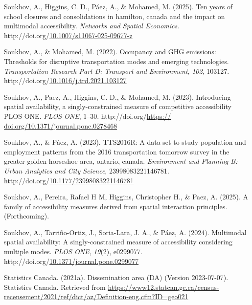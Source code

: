 \documentclass[
11pt, %
oneside, %
english, %
singlespacing, %
]{macthesis} %
\newlength{\cslhangindent}
\newenvironment{CSLReferences}[2] %
{\begin{list}{}{%
	\setlength{\itemindent}{0pt}
	\setlength{\leftmargin}{0pt}
	\setlength{\parsep}{0pt}
	\ifodd #1
	\setlength{\leftmargin}{\cslhangindent}
	\setlength{\itemindent}{-1\cslhangindent}
	\fi
	\setlength{\itemsep}{#2\baselineskip}}}
{\end{list}}
\begin{document}
\begin{CSLReferences}{1}{0}
Soukhov, A., Higgins, C. D., Páez, A., \& Mohamed, M. (2025). Ten years of school closures and consolidations in hamilton, canada and the impact on multimodal accessibility. \emph{Networks and Spatial Economics}. http://doi.org/\href{https://doi.org/10.1007/s11067-025-09677-z}{10.1007/s11067-025-09677-z}

Soukhov, A., \& Mohamed, M. (2022). Occupancy and {GHG} emissions: Thresholds for disruptive transportation modes and emerging technologies. \emph{Transportation Research Part D: Transport and Environment}, \emph{102}, 103127. http://doi.org/\href{https://doi.org/10.1016/j.trd.2021.103127}{10.1016/j.trd.2021.103127}

Soukhov, A., Paez, A., Higgins, C. D., \& Mohamed, M. (2023). Introducing spatial availability, a singly-constrained measure of competitive accessibility {\textbar} {PLOS} {ONE}. \emph{{PLOS} {ONE}}, 1--30. http://doi.org/\href{https://\%20doi.org/10.1371/journal.pone.0278468}{https:// doi.org/10.1371/journal.pone.0278468}

Soukhov, A., \& Páez, A. (2023). {TTS}2016R: A data set to study population and employment patterns from the 2016 transportation tomorrow survey in the greater golden horseshoe area, ontario, canada. \emph{Environment and Planning B: Urban Analytics and City Science}, 23998083221146781. http://doi.org/\href{https://doi.org/10.1177/23998083221146781}{10.1177/23998083221146781}

Soukhov, A., Pereira, Rafael H M, Higgins, Christopher H., \& Paez, A. (2025). A family of accessibility measures derived from spatial interaction principles. (Forthcoming).

Soukhov, A., Tarriño-Ortiz, J., Soria-Lara, J. A., \& Páez, A. (2024). Multimodal spatial availability: A singly-constrained measure of accessibility considering multiple modes. \emph{{PLOS} {ONE}}, \emph{19}(2), e0299077. http://doi.org/\href{https://doi.org/10.1371/journal.pone.0299077}{10.1371/journal.pone.0299077}

Statistics Canada. (2021a). Dissemination area (DA) (Version 2023-07-07). Statistics Canada. Retrieved from \url{https://www12.statcan.gc.ca/census-recensement/2021/ref/dict/az/Definition-eng.cfm?ID=geo021}


\end{CSLReferences}
\end{document}
